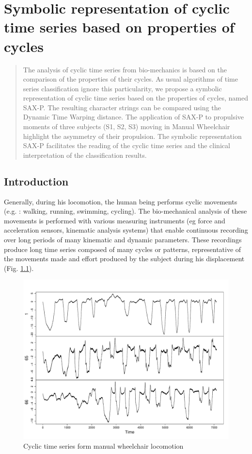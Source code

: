 \chapter[SAX-P]{Symbolic representation of cyclic time series based on properties of cycles}
\label{chapter_saxp}

\begin{abstract} 
The analysis of cyclic time series from bio-mechanics is based on the
comparison of the properties of their cycles. As usual algorithms of time 
series classification ignore this particularity, we propose
a symbolic representation of cyclic time series based on the properties
of cycles, named SAX-P. The resulting character strings can be compared
using the Dynamic Time Warping distance. The application of SAX-P
to propulsive moments of three subjects (S1, S2, S3) moving in Manual
Wheelchair highlight the asymmetry of their propulsion. The symbolic representation SAX-P facilitates the reading of the cyclic time series and the clinical interpretation of the classification results.
\end{abstract} 

\section{Introduction}
\label{introduction}

Generally, during his locomotion, the human being performs cyclic movements (e.g. : walking, running, swimming,
cycling). The bio-mechanical analysis of these movements is performed with various measuring instruments 
(eg force and acceleration sensors, kinematic analysis systems) that enable continuous recording over 
long periods of many kinematic and dynamic parameters. These recordings produce long
time series composed of many cycles or patterns, representative of the movements made and effort 
produced by the subject during his displacement (Fig. \ref{fig:cyclicTS}).


 \begin{figure}[h]
  \centering
   \includegraphics[scale=0.4]{images/sax-p/cycliqueTS}
    \caption{Cyclic time series form manual wheelchair locomotion}
  \label{fig:cyclicTS}
  \end{figure}


